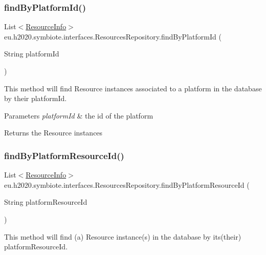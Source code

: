 \subsubsection{\texorpdfstring{find\+By\+Platform\+Id()}{findByPlatformId()}}
{\footnotesize\ttfamily List$<$\hyperlink{classeu_1_1h2020_1_1symbiote_1_1resources_1_1ResourceInfo}{Resource\+Info}$>$ eu.\+h2020.\+symbiote.\+interfaces.\+Resources\+Repository.\+find\+By\+Platform\+Id (\begin{DoxyParamCaption}\item[{String}]{platform\+Id }\end{DoxyParamCaption})}

This method will find Resource instances associated to a platform in the database by their platform\+Id.


\begin{DoxyParams}{Parameters}
{\em platform\+Id} & the id of the platform \\
\hline
\end{DoxyParams}
\begin{DoxyReturn}{Returns}
the Resource instances 
\end{DoxyReturn}
\mbox{\label{interfaceeu_1_1h2020_1_1symbiote_1_1interfaces_1_1ResourcesRepository_ac711b7417029b7f94a9d68e9dbb6df94}} 
\subsubsection{\texorpdfstring{find\+By\+Platform\+Resource\+Id()}{findByPlatformResourceId()}}
{\footnotesize\ttfamily List$<$\hyperlink{classeu_1_1h2020_1_1symbiote_1_1resources_1_1ResourceInfo}{Resource\+Info}$>$ eu.\+h2020.\+symbiote.\+interfaces.\+Resources\+Repository.\+find\+By\+Platform\+Resource\+Id (\begin{DoxyParamCaption}\item[{String}]{platform\+Resource\+Id }\end{DoxyParamCaption})}

This method will find (a) Resource instance(s) in the database by its(their) platform\+Resource\+Id.


